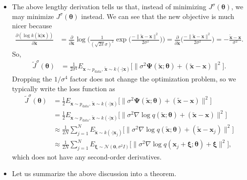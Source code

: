 \documentclass[10pt]{article}
\newcommand{\ve}[1]{\mathbf{#1}}
\newcommand{\mrm}[1]{\mathrm{#1}}
\newcommand{\ves}[1]{\boldsymbol{#1}}
\newcommand{\mcal}[1]{\mathcal{#1}}
\begin{document}
\begin{itemize}
  \item The above lengthy derivation tells us that, instead of minimizing $J^\sigma(\ves{\theta})$, we may minimize $J^\sigma(\ves{\theta})$ instead. We can see that the new objective is much nicer because
  \begin{align*}
    \frac{\partial(\log k(\widetilde{\ve{x}}|\ve{x}))}{\partial \widetilde{\ve{x}}} 
    &= \frac{\partial}{\partial \widetilde{\ve{x}}} \log \bigg( \frac{1}{(\sqrt{2\pi}\sigma)^2} \exp\bigg( \frac{-\| \widetilde{\ve{x}} - \ve{x} \|^2 }{2\sigma^2} \bigg)\bigg) 
    = \frac{\partial}{\partial \widetilde{\ve{x}}} \bigg( \frac{-\| \widetilde{\ve{x}} - \ve{x} \|^2 }{2\sigma^2} \bigg)
    = -\frac{\widetilde{\ve{x}}-\ve{x}}{\sigma^2}.
  \end{align*}
  So,
  \begin{align*}
    \widetilde{J}^\sigma(\ves{\theta})
    &= \frac{1}{2 \sigma^4} E_{\ve{x}\sim p_{\mrm{data}},\, \widetilde{\ve{x}} \sim k(\cdot|\ve{x})} \Big[ \|
    \sigma^2 \ves{\Psi}({\widetilde{\ve{x}};\ves{\theta}}) + (\widetilde{\ve{x}}-\ve{x})
    \|^2 \Big].
  \end{align*}
  Dropping the $1/\sigma^4$ factor does not change the optimization problem, so we typically write the loss function as
  \begin{align*}
    \widetilde{J}^\sigma(\ves{\theta})
    &= \frac{1}{2} E_{\ve{x}\sim p_{\mrm{data}},\, \widetilde{\ve{x}} \sim k(\cdot|\ve{x})} \Big[ \big\|
    \sigma^2 \ves{\Psi}({\widetilde{\ve{x}};\ves{\theta}}) + (\widetilde{\ve{x}}-\ve{x})
    \big\|^2 \Big] \\
    &= \frac{1}{2} E_{\ve{x}\sim p_{\mrm{data}},\, \widetilde{\ve{x}} \sim k(\cdot|\ve{x})} \Big[ \big\|
    \sigma^2 \nabla \log q(\widetilde{\ve{x}};\ves{\theta}) + (\widetilde{\ve{x}}-\ve{x})
    \big\|^2 \Big] \\
    &\approx \frac{1}{2N} \sum_{j=1}^N E_{\widetilde{\ve{x}} \sim k(\cdot|\ve{x}_j)} \Big[ \big\|
    \sigma^2 \nabla \log q(\widetilde{\ve{x}};\ves{\theta}) + (\widetilde{\ve{x}}-\ve{x}_j) \big\|^2
    \Big] \\
    &\approx \frac{1}{2N} \sum_{j=1}^N E_{\ves{\xi} \sim \mcal{N}(\ve{0},\sigma^2 I )} \Big[ \big\|
    \sigma^2 \nabla \log q(\ve{x}_j + \ves{\xi};\ves{\theta}) + \ves{\xi} \big\|^2
    \Big],
  \end{align*}
  which does not have any second-order derivatives.

  \item Let us summarize the above discussion into a theorem.
  

\end{itemize}
\end{document}
